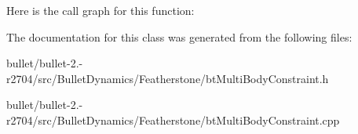 Here is the call graph for this function\+:




The documentation for this class was generated from the following files\+:\begin{DoxyCompactItemize}
\item 
bullet/bullet-\/2.-\/r2704/src/\+Bullet\+Dynamics/\+Featherstone/bt\+Multi\+Body\+Constraint.\+h\item 
bullet/bullet-\/2.-\/r2704/src/\+Bullet\+Dynamics/\+Featherstone/bt\+Multi\+Body\+Constraint.\+cpp\end{DoxyCompactItemize}

